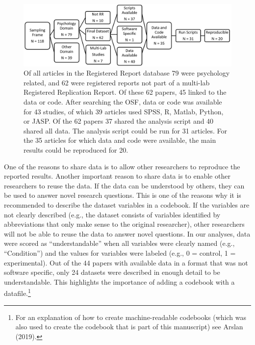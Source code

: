 \documentclass[,jou, a4paper,floatsintext]{apa6}
\let\rmarkdownfootnote\footnote%
\def\footnote{\protect\rmarkdownfootnote}
\begin{document}
\begin{figure}
\begin{center}
\includegraphics[width=\textwidth]{fig1.png}

\caption{Of all articles in the Registered Report database 79 were psychology related, and 62 were registered reports not part of a multi-lab Registered Replication Report. Of these 62 papers, 45 linked to the data or code. After searching the OSF, data or code was available for 43 studies, of which 39 articles used SPSS, R, Matlab, Python, or JASP. Of the 62 papers 37 shared the analysis script and 40 shared all data. The analysis script could be run for 31 articles. For the 35 articles for which data and code were available, the main results could be reproduced for 20. 
}

\label{fig:fig1}
\end{center}
\end{figure}

One of the reasons to share data is to allow other researchers to reproduce the reported results. Another important reason to share data is to enable other researchers to reuse the data. If the data can be understood by others, they can be used to answer novel research questions. This is one of the reasons why it is recommended to describe the dataset variables in a codebook. If the variables are not clearly described (e.g., the dataset consists of variables identified by abbreviations that only make sense to the original researcher), other researchers will not be able to reuse the data to answer novel questions. In our analyses, data were scored as \enquote{understandable} when all variables were clearly named (e.g., \enquote{Condition}) and the values for variables were labeled (e.g., 0 = control, 1 = experimental). Out of the 44 papers with available data in a format that was not software specific, only 24 datasets were described in enough detail to be understandable. This highlights the importance of adding a codebook with a datafile.\footnote{For an explanation of how to create machine-readable codebooks (which was also used to create the codebook that is part of this manuscript) see Arslan (2019).}
\end{document}
